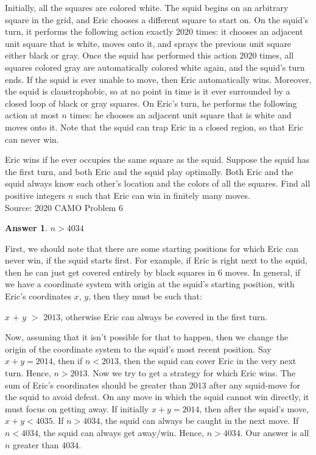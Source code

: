 \documentclass[12pt]{article}
\newtheorem*{answer*}{Answer}
\renewenvironment{proof}{{\bfseries Proof.}}{}
\begin{document}
Initially, all the squares are colored white. The squid begins on an arbitrary square in the grid, and Eric chooses a different square to start on. On the squid's turn, it performs the following action exactly $2020$ times: it chooses an adjacent unit square that is white, moves onto it, and sprays the previous unit square either black or gray. Once the squid has performed this action $2020$ times, all squares colored gray are automatically colored white again, and the squid's turn ends. If the squid is ever unable to move, then Eric automatically wins. Moreover, the squid is claustrophobic, so at no point in time is it ever surrounded by a closed loop of black or gray squares. On Eric's turn, he performs the following action at most $n$ times: he chooses an adjacent unit square that is white and moves onto it. Note that the squid can trap Eric in a closed region, so that Eric can never win.

Eric wins if he ever occupies the same square as the squid. Suppose the squid has the first turn, and both Eric and the squid play optimally. Both Eric and the squid always know each other's location and the colors of all the squares. Find all positive integers $n$ such that Eric can win in finitely many moves.\\

Source: 2020 CAMO Problem 6\\

\begin{answer*}
$n > 4034$
\end{answer*}

\begin{proof}
First, we should note that there are some starting positions for which Eric can never win, if the squid starts first. For example, if Eric is right next to the squid, then he can just get covered entirely by black squares in 6 moves. In general, if we have a coordinate system with origin at the squid's starting position, with Eric's coordinates $x$, $y$, then they must be such that:

$x$ $+$ $y$ $>$ $2013$, otherwise Eric can always be covered in the first turn.

Now, assuming that it isn't possible for that to happen, then we change the origin of the coordinate system to the squid's most recent position. Say $x + y = 2014$, then if $n < 2013$, then the squid can cover Eric in the very next turn. Hence, $n > 2013$. Now we try to get a strategy for which Eric wins. The sum of Eric's coordinates should be greater than $2013$ after any squid-move for the squid to avoid defeat. On any move in which the squid cannot win directly, it must focus on getting away. If initially $x + y = 2014$, then after the squid's move, $x + y < 4035$. If $n > 4034$, the squid can always be caught in the next move. If $n < 4034$, the squid can always get away/win. Hence, $n > 4034$. Our answer is all $n$ greater than $4034$.
\end{proof}
\end{document}
